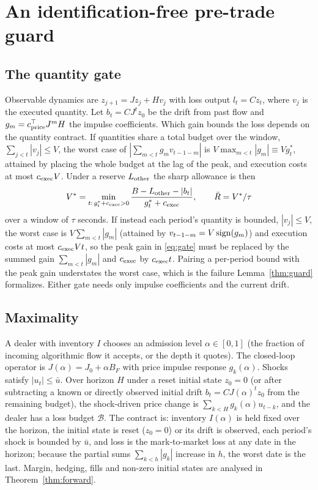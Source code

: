 \section{An identification-free pre-trade guard}\label{sec:guard}

\subsection{The quantity gate}
Observable dynamics are $z_{j+1}=Jz_j+Hv_j$ with loss output $l_t=Cz_t$, where $v_j$ is the executed quantity. Let $b_t=CJ^tz_0$ be the drift from past flow and $g_m=c^\top_{\rm price}J^mH$ the impulse coefficients. Which gain bounds the loss depends on the quantity contract. If quantities share a total budget over the window, $\sum_{j<t}|v_j|\le V$, the worst case of $|\sum_{m<t}g_mv_{t-1-m}|$ is $V\max_{m<t}|g_m|\equiv Vg^*_t$, attained by placing the whole budget at the lag of the peak, and execution costs at most $c_{\rm exec}V$. Under a reserve $L_{\rm other}$ the sharp allowance is then
\begin{equation}\label{eq:gate}
V^*=\min_{t:\,g^*_t+c_{\rm exec}>0}\frac{B-L_{\rm other}-|b_t|}{g^*_t+c_{\rm exec}},\qquad\bar R=V^*/\tau
\end{equation}
over a window of $\tau$ seconds. If instead each period's quantity is bounded, $|v_j|\le V$, the worst case is $V\sum_{m<t}|g_m|$ (attained by $v_{t-1-m}=V\,{\rm sign}(g_m)$) and execution costs at most $c_{\rm exec}Vt$, so the peak gain in \eqref{eq:gate} must be replaced by the summed gain $\sum_{m<t}|g_m|$ and $c_{\rm exec}$ by $c_{\rm exec}t$. Pairing a per-period bound with the peak gain understates the worst case, which is the failure Lemma~\ref{thm:guard} formalizes. Either gate needs only impulse coefficients and the current drift.

\subsection{Maximality}
A dealer with inventory $I$ chooses an admission level $\alpha\in[0,1]$ (the fraction of incoming algorithmic flow it accepts, or the depth it quotes). The closed-loop operator is $J(\alpha)=J_0+\alpha B_F$ with price impulse response $g_k(\alpha)$. Shocks satisfy $|u_t|\le\bar u$. Over horizon $H$ under a reset initial state $z_0=0$ (or after subtracting a known or directly observed initial drift $b_t=CJ(\alpha)^t z_0$ from the remaining budget), the shock-driven price change is $\sum_{k<H}g_k(\alpha)u_{t-k}$, and the dealer has a loss budget $\mathcal B$. The contract is: inventory $I(\alpha)$ is held fixed over the horizon, the initial state is reset ($z_0=0$) or its drift is observed, each period's shock is bounded by $\bar u$, and loss is the mark-to-market loss at any date in the horizon; because the partial sums $\sum_{k<h}|g_k|$ increase in $h$, the worst date is the last. Margin, hedging, fills and non-zero initial states are analysed in Theorem~\ref{thm:forward}.

